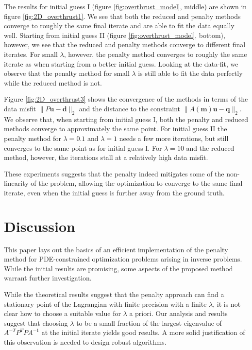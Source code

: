 \documentclass{iopart}
\begin{document}
{The results for initial guess I (figure \ref{fig:overthrust_model}, middle) are shown in figure \ref{fig:2D_overthrust1}. We see that both the reduced and penalty methods converge to roughly the same final iterate and are able to fit the data equally well. Starting from initial guess II (figure \ref{fig:overthrust_model}, bottom), however, we see that the reduced and penalty methods converge to different final iterates. For small $\lambda$, however, the penalty method converges to roughly the same iterate as when starting from a better initial guess. Looking at the data-fit, we observe that the penalty method for small $\lambda$ is still able to fit the data perfectly while the reduced method is not.

Figure \ref{fig:2D_overthrust3} shows the convergence of the methods in terms of the data misfit $\|P\mathbf{u} - \mathbf{d}\|_2$ and the distance to the constraint $\|A(\mathbf{m})\mathbf{u} - \mathbf{q}\|_2$. We observe that, when starting from initial guess I, both the penalty and reduced methods converge to approximately the same point. For initial guess II the penalty method for $\lambda=0.1$ and $\lambda=1$ needs a few more iterations, but still converges to the same point as for initial guess I. For $\lambda=10$ and the reduced method, however, the iterations stall at a relatively high data misfit.

These experiments suggests that the penalty indeed mitigates some of the non-linearity of the problem, allowing the optimization to converge to the same final iterate, even when the initial guess is further away from the ground truth.

\section{Discussion}
\label{discussion}
This paper lays out the basics of an efficient implementation of the penalty method for PDE-constrained optimization problems arising in inverse problems. While the initial results are promising, some aspects of the proposed method warrant further investigation.

While the theoretical results suggest that the penalty approach can find a stationary point of the Lagrangian with finite precision with a finite $\lambda$, it is not clear how to choose a suitable value for $\lambda$ a priori. Our analysis and results suggest that choosing $\lambda$ to be a small fraction of the largest eigenvalue of $A^{-T}P^T\!PA^{-1}$ at the initial iterate yields good results. A more solid justification of this observation is needed to design robust algorithms.

}
\end{document}
